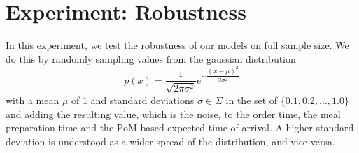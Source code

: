 \section{Experiment: Robustness}\label{sec:noise}
In this experiment, we test the robustness of our models on full sample size. We do this by randomly sampling values from the gaussian distribution
\begin{equation}
	p(x) = \dfrac{1}{\sqrt{2\pi\sigma^{2}}} e^{-\dfrac{(x-\mu)^2}{2\sigma^2}}
\end{equation}
with a mean $ \mu $ of 1 and standard deviations $ \sigma \in \Sigma $ in the set of $ \{0.1, 0.2, \dots, 1.0\} $ and adding the resulting value, which is the noise, to the order time, the meal preparation time and the PoM-based expected time of arrival. A higher standard deviation is understood as a wider spread of the distribution, and vice versa. 

